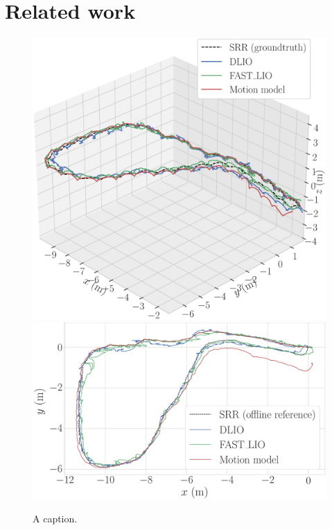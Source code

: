 \section{Related work}
\begin{figure}
  \centering 
  \includegraphics[width=\linewidth]{img/trajectory_3d}
  \includegraphics[width=\linewidth]{img/trajectory_xy}
  \caption{A caption.}
\end{figure}